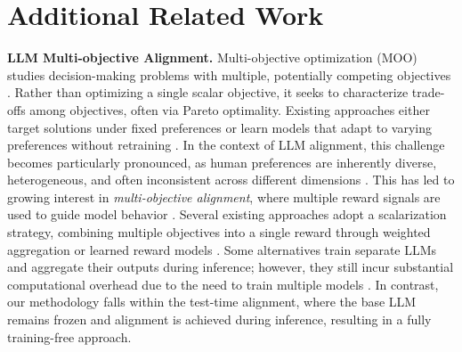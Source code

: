 \documentclass{article}
\begin{document}
 


\newpage
\appendix

\section{Additional Related Work}
\textbf{LLM Multi-objective Alignment.}
Multi-objective optimization (MOO) studies decision-making problems with multiple, potentially competing objectives \citep{ye2021multi}. Rather than optimizing a single scalar objective, it seeks to characterize trade-offs among objectives, often via Pareto optimality. Existing approaches either target solutions under fixed preferences \citep{ye2021multi,linreasonable,chen2024ferero,zhang2024gliding,chen2025gradient} or learn models that adapt to varying preferences without retraining \citep{navonlearning,lin2022pareto,shu2024learning,dimitriadispareto}.
In the context of LLM alignment, this challenge becomes particularly pronounced, as human preferences are inherently diverse, heterogeneous, and often inconsistent across different dimensions \citep{yang2024rewards,lin2025parm}. This has led to growing interest in \emph{multi-objective alignment}, where multiple reward signals are used to guide model behavior \citep{li2025gradient,zhou2024beyond,guo2024controllable,yang2024rewards}. Several existing approaches adopt a scalarization strategy, combining multiple objectives into a single reward through weighted aggregation or learned reward models \citep{li2020deep,zhou2024beyond,wu2023fine}. Some alternatives train separate LLMs and aggregate their outputs during inference; however, they still incur substantial computational overhead due to the need to train multiple models \citep{rame2023rewarded,jang2023consistency}. 
In contrast, our methodology falls within the test-time alignment, where the base LLM remains frozen and alignment is achieved during inference, resulting in a fully training-free approach.
\end{document}

